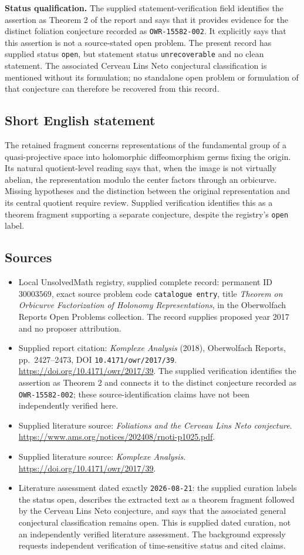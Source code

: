 \documentclass[11pt]{article}
\begin{document}
\textbf{Status qualification.} The supplied statement-verification field identifies the assertion as Theorem 2 of the report and says that it provides evidence for the distinct foliation conjecture recorded as \texttt{OWR-15582-002}. It explicitly says that this assertion is not a source-stated open problem. The present record has supplied status \texttt{open}, but statement status \texttt{unrecoverable} and no clean statement. The associated Cerveau Lins Neto conjectural classification is mentioned without its formulation; no standalone open problem or formulation of that conjecture can therefore be recovered from this record.
\subsection{Short English statement}
The retained fragment concerns representations of the fundamental group of a quasi-projective space into holomorphic diffeomorphism germs fixing the origin. Its natural quotient-level reading says that, when the image is not virtually abelian, the representation modulo the center factors through an orbicurve. Missing hypotheses and the distinction between the original representation and its central quotient require review. Supplied verification identifies this as a theorem fragment supporting a separate conjecture, despite the registry's \texttt{open} label.
\subsection{Sources}
\begin{itemize}
\item Local UnsolvedMath registry, supplied complete record: permanent ID \(30003569\), exact source problem code \texttt{catalogue entry}, title \emph{Theorem on Orbicurve Factorization of Holonomy Representations}, in the Oberwolfach Reports Open Problems collection. The record supplies proposed year 2017 and no proposer attribution.
\item Supplied report citation: \emph{Komplexe Analysis} (2018), Oberwolfach Reports, pp.~2427--2473, DOI \texttt{10.4171/owr/2017/39}. \url{https://doi.org/10.4171/owr/2017/39}. The supplied verification identifies the assertion as Theorem 2 and connects it to the distinct conjecture recorded as \texttt{OWR-15582-002}; these source-identification claims have not been independently verified here.
\item Supplied literature source: \emph{Foliations and the Cerveau Lins Neto conjecture}. \url{https://www.ams.org/notices/202408/rnoti-p1025.pdf}.
\item Supplied literature source: \emph{Komplexe Analysis}. \url{https://doi.org/10.4171/owr/2017/39}.
\item Literature assessment dated exactly \texttt{2026-08-21}: the supplied curation labels the status open, describes the extracted text as a theorem fragment followed by the Cerveau Lins Neto conjecture, and says that the associated general conjectural classification remains open. This is supplied dated curation, not an independently verified literature assessment. The background expressly requests independent verification of time-sensitive status and cited claims.
\end{itemize}
\end{document}
